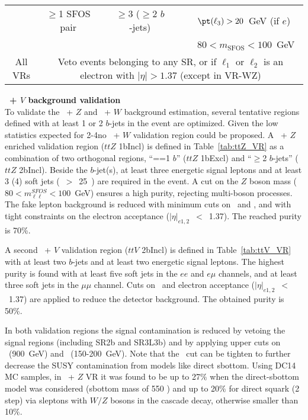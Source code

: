 \begin{table}[htb!]
{\begin{tabular}{c|c|c|c|c|c|l}
          &$\geq$1 SFOS pair &         & $\geq$3 ($\geq$2 $b$-jets) &           &     & $\pt(\ell_3)>20$~GeV (if $e$)\\
          &        &         &                           &          &         & $80<m_\text{SFOS}<100$~GeV \\
\hline\hline
All VRs & \multicolumn{6}{c}{Veto events belonging to any SR, or if $\ell_1$ or $\ell_2$ is an electron with $|\eta|>1.37$ (except in VR-WZ)}\\
\hline\hline
\end{tabular}
}
\end{table}


\par{\bf \ttbar\ + $V$ background validation\\}
To validate the \ttbar\ + $Z$ and \ttbar\ + $W$ background estimation, several tentative regions defined with at least 1 or 2 $b$-jets in the event are optimized. Given the low statistics expected for 2-4\ifb no \ttbar\ + $W$ validation region could be proposed. A \ttbar\ + $Z$ enriched validation region ($ttZ$ 1bIncl) is defined in Table~\ref{tab:ttZ_VR} as a combination of two orthogonal regions, ``==1 $b$'' ($ttZ$ 1bExcl) and ``$\ge$2 $b$-jets'' ($ttZ$ 2bIncl). Beside the $b$-jet(s), at least three energetic signal leptons and at least 3 (4) soft jets (\pt~$>$~25~\GeV) are required in the event. A cut on the $Z$ boson mass ($80 < m^{SFOS}_{\ell\ell} < 100$~GeV) ensures a high purity, rejecting multi-boson processes. The fake lepton background is reduced with minimum cuts on \met\ and \meff, and with tight constraints on the electron acceptance ($|\eta|_{e1,2}$~$<$~1.37). The reached purity is 70\%. 

A second \ttbar\ + $V$ validation region ($ttV$ 2bIncl) is defined in Table~\ref{tab:ttV_VR} with at least two $b$-jets and at least two energetic signal leptons. The highest purity is found with at least five soft jets in the $ee$ and $e\mu$ channels, and at least three soft jets in the $\mu\mu$ channel. Cuts on \meff\  and electron acceptance ($|\eta|_{e1,2}$~$<$~1.37) are applied to reduce the detector background. The obtained purity is 50\%. 

In both validation regions the signal contamination is reduced by vetoing the signal regions (including SR2b and SR3L3b) and by 
applying upper cuts on \meff\ (900~GeV) and \met\ (150-200~GeV). 
Note that the \meff\ cut can be tighten to further decrease the SUSY contamination from models like direct sbottom. Using DC14 MC samples, in \ttbar\ + $Z$ VR it was found to be up to 27$\%$ when the direct-sbottom model was considered (sbottom mass of 550 \GeV) and up to 20$\%$ for direct squark (2 step) via sleptons with $W/Z$ bosons in the cascade decay, otherwise smaller than 10$\%$.   

